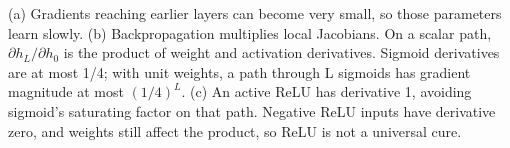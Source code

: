 (a) Gradients reaching earlier layers can become very small, so those parameters learn slowly.
(b) Backpropagation multiplies local Jacobians. On a scalar path, \(\partial h_L/\partial h_0\) is the product of weight and activation derivatives. Sigmoid derivatives are at most 1/4; with unit weights, a path through L sigmoids has gradient magnitude at most \((1/4)^L\).
(c) An active ReLU has derivative 1, avoiding sigmoid's saturating factor on that path. Negative ReLU inputs have derivative zero, and weights still affect the product, so ReLU is not a universal cure.

